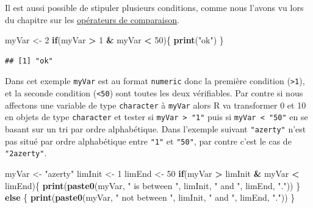\documentclass[
]{book}
\newenvironment{Shaded}{\begin{snugshade}}{\end{snugshade}}
\newcommand{\ControlFlowTok}[1]{\textcolor[rgb]{0.13,0.29,0.53}{\textbf{#1}}}
\newcommand{\DecValTok}[1]{\textcolor[rgb]{0.00,0.00,0.81}{#1}}
\newcommand{\KeywordTok}[1]{\textcolor[rgb]{0.13,0.29,0.53}{\textbf{#1}}}
\newcommand{\NormalTok}[1]{#1}
\newcommand{\OperatorTok}[1]{\textcolor[rgb]{0.81,0.36,0.00}{\textbf{#1}}}
\newcommand{\StringTok}[1]{\textcolor[rgb]{0.31,0.60,0.02}{#1}}
\begin{document}
Il est aussi possible de stipuler plusieurs conditions, comme nous l'avons vu lors du chapitre sur les \protect\hyperlink{l011opcomp}{opérateurs de comparaison}.

\begin{Shaded}
\begin{Highlighting}[]
\NormalTok{myVar <-}\StringTok{ }\DecValTok{2}
\ControlFlowTok{if}\NormalTok{(myVar }\OperatorTok{>}\StringTok{ }\DecValTok{1} \OperatorTok{&}\StringTok{ }\NormalTok{myVar }\OperatorTok{<}\StringTok{ }\DecValTok{50}\NormalTok{)\{}
  \KeywordTok{print}\NormalTok{(}\StringTok{"ok"}\NormalTok{)}
\NormalTok{\}}
\end{Highlighting}
\end{Shaded}

\begin{verbatim}
## [1] "ok"
\end{verbatim}

Dans cet exemple \texttt{myVar} est au format \texttt{numeric} donc la première condition (\texttt{\textgreater{}1}), et la seconde condition (\texttt{\textless{}50}) sont toutes les deux vérifiables. Par contre si nous affectons une variable de type \texttt{character} à \texttt{myVar} alors R va transformer 0 et 10 en objets de type \texttt{character} et tester si \texttt{myVar\ \textgreater{}\ "1"} puis si \texttt{myVar\ \textless{}\ "50"} en se basant sur un tri par ordre alphabétique. Dans l'exemple suivant \texttt{"azerty"} n'est pas situé par ordre alphabétique entre \texttt{"1"} et \texttt{"50"}, par contre c'est le cas de \texttt{"2azerty"}.

\begin{Shaded}
\begin{Highlighting}[]
\NormalTok{myVar <-}\StringTok{ "azerty"}
\NormalTok{limInit <-}\StringTok{ }\DecValTok{1}
\NormalTok{limEnd <-}\StringTok{ }\DecValTok{50}
\ControlFlowTok{if}\NormalTok{(myVar }\OperatorTok{>}\StringTok{ }\NormalTok{limInit }\OperatorTok{&}\StringTok{ }\NormalTok{myVar }\OperatorTok{<}\StringTok{ }\NormalTok{limEnd)\{}
  \KeywordTok{print}\NormalTok{(}\KeywordTok{paste0}\NormalTok{(myVar, }\StringTok{" is between "}\NormalTok{, limInit, }\StringTok{" and "}\NormalTok{, limEnd, }\StringTok{"."}\NormalTok{))}
\NormalTok{\} }\ControlFlowTok{else}\NormalTok{ \{}
  \KeywordTok{print}\NormalTok{(}\KeywordTok{paste0}\NormalTok{(myVar, }\StringTok{" not between "}\NormalTok{, limInit, }\StringTok{" and "}\NormalTok{, limEnd, }\StringTok{"."}\NormalTok{))}
\NormalTok{\}}
\end{Highlighting}
\end{Shaded}
\end{document}
